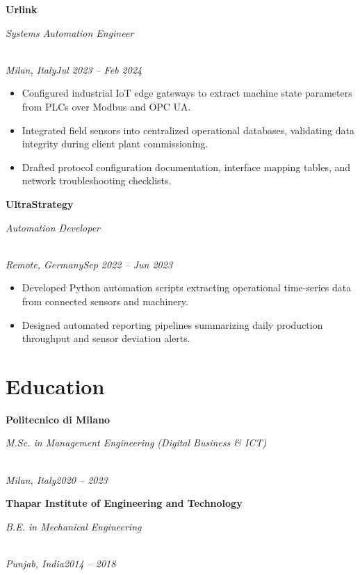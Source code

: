\documentclass[a4paper,10pt]{article}
\newcommand{\role}[4]{\vspace{3pt}\noindent\hspace{0.6em}\parbox[t]{0.38\textwidth}{\raggedright\textbf{#1}}\hfill\parbox[t]{0.58\textwidth}{\raggedleft\textit{#2}}\\{\textit{#3}\hfill\textit{#4}}\vspace{1pt}}
\begin{document}
\role{Urlink}{Systems Automation Engineer}{Milan, Italy}{Jul 2023 -- Feb 2024}
\begin{itemize}
\item Configured industrial IoT edge gateways to extract machine state parameters from PLCs over Modbus and OPC UA.
\item Integrated field sensors into centralized operational databases, validating data integrity during client plant commissioning.
\item Drafted protocol configuration documentation, interface mapping tables, and network troubleshooting checklists.
\end{itemize}

\role{UltraStrategy}{Automation Developer}{Remote, Germany}{Sep 2022 -- Jun 2023}
\begin{itemize}
\item Developed Python automation scripts extracting operational time-series data from connected sensors and machinery.
\item Designed automated reporting pipelines summarizing daily production throughput and sensor deviation alerts.
\end{itemize}

\section{Education}
\role{Politecnico di Milano}{M.Sc. in Management Engineering (Digital Business \& ICT)}{Milan, Italy}{2020 -- 2023}
\role{Thapar Institute of Engineering and Technology}{B.E. in Mechanical Engineering}{Punjab, India}{2014 -- 2018}
\end{document}

